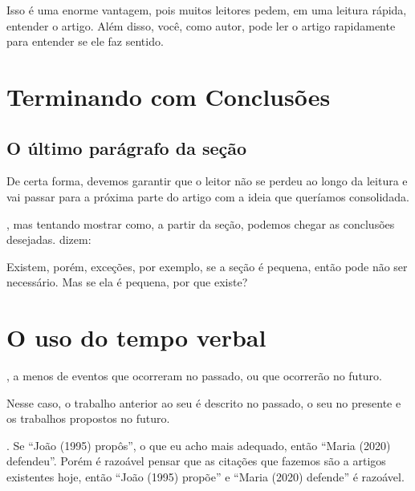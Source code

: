 \documentclass[openany]{book}
\begin{document}
 Isso é uma enorme vantagem, pois muitos leitores pedem, em uma leitura rápida, entender o artigo. Além disso, você, como autor, pode ler o artigo rapidamente para entender se ele faz sentido.

\chapter{Terminando com Conclusões}

\section{O último parágrafo da seção}

  De certa forma, devemos garantir que o leitor não se perdeu ao longo da leitura e vai passar para a próxima parte do artigo com a ideia que queríamos consolidada.

, mas tentando mostrar como, a partir da seção, podemos chegar as conclusões desejadas. \citet{Knuth:1997} dizem:


Existem, porém, exceções, por exemplo, se a seção é pequena, então pode não ser necessário. Mas se ela é pequena, por que existe?


\chapter{O uso do tempo verbal}

, a menos de eventos que ocorreram no passado, ou que ocorrerão no futuro.

 Nesse caso, o trabalho anterior ao seu é descrito no passado, o seu no presente e os trabalhos propostos no futuro.

. Se ``João (1995) propôs'', o que eu acho mais adequado, então ``Maria (2020) defendeu''. Porém é razoável pensar que as citações que fazemos são a artigos existentes hoje, então ``João (1995) propõe'' e ``Maria (2020) defende'' é razoável.
\end{document}
